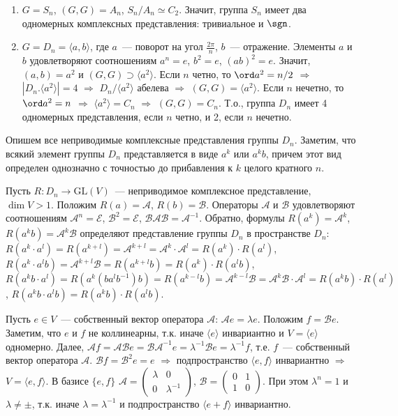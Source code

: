 \documentclass[a4paper]{article}
\begin{document}
\begin{ex}
\begin{enumerate}
  \item $G=S_n$, $(G,G)=A_n$, $S_n/A_n\simeq C_2$. Значит, группа
  $S_n$ имеет два одномерных комплексных представления: тривиальное
  и $\sgn$.
  \item $G=D_n=\langle a,b\rangle$, где $a$~--- поворот на угол
  $\frac{2\pi}{n}$, $b$~--- отражение. Элементы $a$ и $b$
  удовлетворяют соотношениям $a^n=e$, $b^2=e$, $(ab)^2=e$. Значит,
  $(a,b)=a^2$ и $(G,G)\supset \langle a^2\rangle$. Если $n$ четно,
  то $\ord a^2=n/2$ $\Rightarrow$ $|D_n.\langle a^2\rangle|=4$
  $\Rightarrow$ $D_n/\langle a^2\rangle$ абелева $\Rightarrow$ $(G,G)=\langle
  a^2\rangle$. Если $n$ нечетно, то $\ord a^2=n$ $\Rightarrow$ $\langle
  a^2\rangle=C_n$ $\Rightarrow$ $(G,G)=C_n$. Т.о., группа $D_n$
  имеет 4 одномерных представления, если $n$ четно, и 2, если $n$
  нечетно.
\end{enumerate}
\end{ex}
Опишем все неприводимые комплексные представления группы $D_n$.
Заметим, что всякий элемент группы $D_n$ представляется в виде $a^k$
или $a^kb$, причем этот вид определен однозначно с точностью до
прибавления к $k$ целого кратного $n$.

Пусть $R\colon D_n\to \mathrm{GL}(V)$~--- неприводимое комплексное
представление, $\dim V>1$. Положим $R(a)=\mathcal{A}$,
$R(b)=\mathcal{B}$. Операторы $\mathcal{A}$ и $\mathcal{B}$
удовлетворяют соотношениям $\mathcal{A}^n=\mathcal{E}$,
$\mathcal{B}^2=\mathcal{E}$, $\mathcal{BAB}=\mathcal{A}^{-1}$.
Обратно, формулы $R(a^k)=\mathcal{A}^k$,
$R(a^kb)=\mathcal{A}^k\mathcal{B}$ определяют представление группы
$D_n$ в пространстве $D_n$: $R(a^k\cdot
a^l)=R(a^{k+l})=\mathcal{A}^{k+l}=\mathcal{A}^k\cdot\mathcal{A}^l=R(a^k)\cdot
R(a^l)$, $R(a^k\cdot
a^lb)=\mathcal{A}^{k+l}\mathcal{B}=R(a^{k+l}b)=R(a^k)\cdot R(a^lb)$,
$R(a^kb\cdot
a^l)=R(a^k(ba^lb^{-1})b)=R(a^{k-l}b)=\mathcal{A}^{k-l}\mathcal{B}=\mathcal{A}^k\mathcal{B}\cdot
\mathcal{A}^l=R(a^kb)\cdot R(a^l)$, $R(a^kb\cdot a^lb)=R(a^kb)\cdot
R(a^lb)$.

Пусть $e\in V$~--- собственный вектор оператора $\mathcal{A}$:
$\mathcal{A}e=\lambda e$. Положим $f=\mathcal{B}e$. Заметим, что $e$
и $f$ не коллинеарны, т.к. иначе $\langle e\rangle$ инвариантно и
$V=\langle e\rangle$ одномерно. Далее,
$\mathcal{A}f=\mathcal{AB}e=\mathcal{BA}^{-1}e=\lambda^{-1}\mathcal{B}e=\lambda^{-1}f$,
т.е. $f$~--- собственный вектор оператора $\mathcal{A}$.
$\mathcal{B}f=\mathcal{B}^2e=e$ $\Rightarrow$ подпространство
$\langle e,f\rangle$ инвариантно $\Rightarrow$ $V=\langle
e,f\rangle$. В базисе $\{e,f\}$
$\mathcal{A}=\left(\begin{smallmatrix} \lambda & 0\\
0 & \lambda^{-1} \end{smallmatrix}\right)$, $\mathcal{B}=\left(\begin{smallmatrix} 0 & 1\\
1 & 0 \end{smallmatrix}\right)$. При этом $\lambda^n=1$ и
$\lambda\neq \pm$, т.к. иначе $\lambda=\lambda^{-1}$ и
подпространство $\langle e+f\rangle$ инвариантно.
\end{document}
